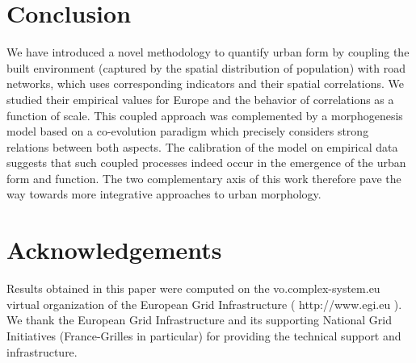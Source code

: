 \documentclass[11pt]{article}
\begin{document}
\section*{Conclusion}


We have introduced a novel methodology to quantify urban form by coupling the built environment (captured by the spatial distribution of population) with road networks, which uses corresponding indicators and their spatial correlations. We studied their empirical values for Europe and the behavior of correlations as a function of scale. This coupled approach was complemented by a morphogenesis model based on a co-evolution paradigm which precisely considers strong relations between both aspects. The calibration of the model on empirical data suggests that such coupled processes indeed occur in the emergence of the urban form and function. The two complementary axis of this work therefore pave the way towards more integrative approaches to urban morphology.


\section*{Acknowledgements}

Results obtained in this paper were computed on the vo.complex-system.eu virtual organization of the European Grid Infrastructure ( http://www.egi.eu ). We thank the European Grid Infrastructure and its supporting National Grid Initiatives (France-Grilles in particular) for providing the technical support and infrastructure.



\end{document}
